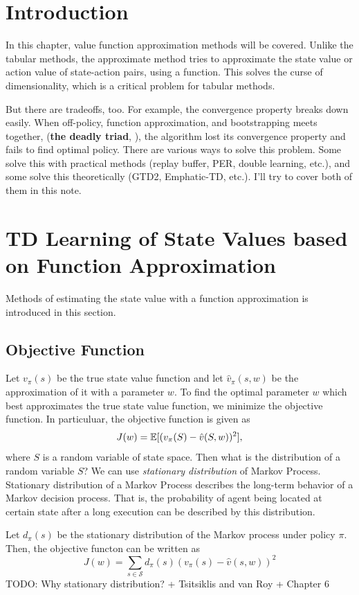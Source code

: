 \section{Introduction}
In this chapter, value function approximation methods will be covered. Unlike the tabular methods, the approximate method tries to
approximate the state value or action value of state-action pairs, using a function. This solves the curse of dimensionality, which is a critical problem for tabular methods.

But there are tradeoffs, too. For example, the convergence property breaks down easily. When off-policy, function approximation, and bootstrapping meets together,
(\textbf{the deadly triad}, \cite{Sutton2020}), the algorithm lost its convergence property and fails to find optimal policy. There are various ways to solve this problem.
Some solve this with practical methods (replay buffer, PER, double learning, etc.), and some solve this theoretically (GTD2, Emphatic-TD, etc.).
I'll try to cover both of them in this note.

\section{TD Learning of State Values based on Function Approximation}
Methods of estimating the state value with a function approximation is introduced in this section.
    \subsection{Objective Function}
        Let $v_\pi(s)$ be the true state value function and let $\hat{v}_\pi(s, w)$ be the approximation of it with a parameter $w$.
        To find the optimal parameter $w$ which best approximates the true state value function, we minimize the objective function. 
        In particuluar, the objective function is given as
        \begin{equation}
            J(w) = \mathbb{E}[(v_\pi(S) - \hat{v}(S, w))^2],
        \end{equation}
        where $S$ is a random variable of state space. Then what is the distribution of a random variable $S$?
        We can use \emph{stationary distribution} of Markov Process. Stationary distribution of a Markov Process describes the long-term behavior of a Markov decision process.
        That is, the probability of agent being located at certain state after a long execution can be described by this distribution.

        Let $d_\pi(s)$ be the stationary distribution of the Markov process under policy $\pi$. Then, the objective functon can be written as
        \begin{equation}
            J(w) = \sum_{s \in \mathcal{S}}d_\pi(s)(v_\pi(s) - \hat{v}(s, w))^2 \label{eq:stationaryDist}
        \end{equation}
        TODO: Why stationary distribution? + Tsitsiklis and van Roy + Chapter 6

